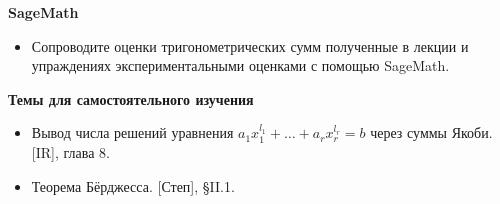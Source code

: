 \noindent\textbf{SageMath}
\begin{itemize}[topsep=0pt]
    \item Сопроводите оценки тригонометрических сумм полученные в лекции и упраждениях экспериментальными оценками с помощью SageMath.
\end{itemize}


\noindent\textbf{Темы для самостоятельного изучения}

\begin{itemize}[topsep=0pt]
    \item Вывод числа решений уравнения $a_1 x_1^{l_1} + \dots + a_r x_r^{l_r}=b$ через суммы Якоби. [IR], глава 8.
    \item Теорема Бёрджесса. [Степ], \S II.1.
\end{itemize}
